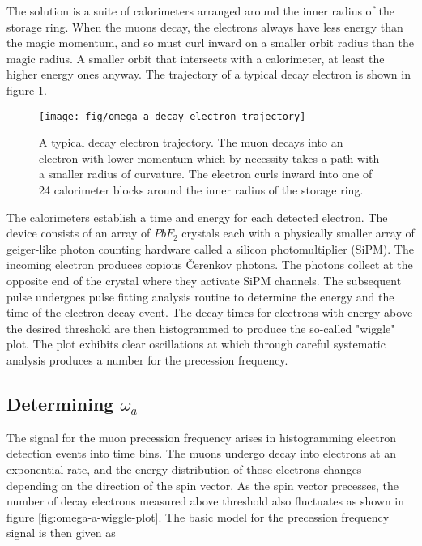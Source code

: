 The solution is a suite of calorimeters arranged around the inner radius of the storage ring.  When the muons decay, the electrons always have less energy than the magic momentum, and so must curl inward on a smaller orbit radius than the magic radius.  A smaller orbit that intersects with a calorimeter, at least the higher energy ones anyway. The trajectory of a typical decay electron is shown in figure \ref{fig:omega-a-decay-electron-trajectory}.

\begin{figure}
\label{fig:omega-a-decay-electron-trajectory}
\texttt{[image: fig/omega-a-decay-electron-trajectory]}
\caption{A typical decay electron trajectory.  The muon decays into an electron with lower momentum which by necessity takes a path with a smaller radius of curvature.  The electron curls inward into one of 24 calorimeter blocks around the inner radius of the storage ring.}
\end{figure}

The calorimeters establish a time and energy for each detected electron.  The device consists of an array of $PbF_2$ crystals each with a physically smaller array of geiger-like photon counting hardware called a silicon photomultiplier (SiPM).  The incoming electron produces copious \v{C}erenkov photons.  The photons collect at the opposite end of the crystal where they activate SiPM channels.  The subsequent pulse undergoes pulse fitting analysis routine to determine the energy and the time of the electron decay event.  The decay times for electrons with energy above the desired threshold are then histogrammed to produce the so-called "wiggle" plot.  The plot exhibits clear oscillations at \wa which through careful systematic analysis produces a number for the precession frequency.

\subsection{Determining $\omega_a$}

The signal for the muon precession frequency arises in histogramming electron detection events into time bins.  The muons undergo decay into electrons at an exponential rate, and the energy distribution of those electrons changes depending on the direction of the spin vector.  As the spin vector precesses, the number of decay electrons measured above threshold also fluctuates as shown in figure \ref{fig:omega-a-wiggle-plot}.  The basic model for the precession frequency signal is then given as 

